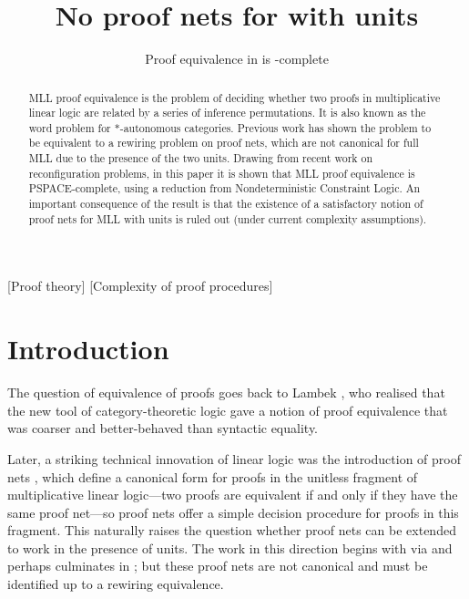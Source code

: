 \documentclass{sigplanconf}
\title{No proof nets for \capsabbrev{mll} with units}
\subtitle{Proof equivalence in \capsabbrev{mll} is \capsabbrev{pspace}-complete}
\let\beforesection=\medskip
\let\aftersection=\noindent
\let\capsabbrev=\uppercase
\begin{document}
\maketitle


[Proof theory]
[Complexity of proof procedures]


\begin{abstract}
\capsabbrev{mll} proof equivalence is the problem of deciding whether two proofs in multiplicative linear logic are related by a series of inference permutations.
%
It is also known as the word problem for $*$-autonomous categories.
%
Previous work has shown the problem to be equivalent to a rewiring problem on proof nets, which are not canonical for full \capsabbrev{mll} due to the presence of the two units.
%
Drawing from recent work on reconfiguration problems, in this paper it is shown that \capsabbrev{mll} proof equivalence is \capsabbrev{pspace}-complete, using a reduction from Nondeterministic Constraint Logic.
%
An important consequence of the result is that the existence of a satisfactory notion of proof nets for \capsabbrev{mll} with units is ruled out (under current complexity assumptions).
\end{abstract}


\beforesection

\section{Introduction}

\aftersection
%
The question of equivalence of proofs goes back to Lambek \cite{Lambek-1968}, who realised that the new tool of category-theoretic logic gave a notion of proof equivalence that was coarser and better-behaved than syntactic equality.

Later, a striking technical innovation of linear logic was the introduction of proof nets \cite{Girard-1987,Danos-Regnier-1989}, which define a canonical form for proofs in the unitless fragment of multiplicative linear logic---two proofs are equivalent if and only if they have the same proof net---so proof nets offer a simple decision procedure for proofs in this fragment. This naturally raises the question whether proof nets can be extended to work in the presence of units. The work in this direction begins with \cite{Trimble-1994,Blute-Cockett-Seely-Trimble-1996} via \color{red}\cite{Lamarche-Strassburger-2006} \color{black} and perhaps culminates in \cite{HughesFreeStar,HughesMLLProofNets}; but these proof nets are not canonical and must be identified up to a rewiring equivalence.
\end{document}
